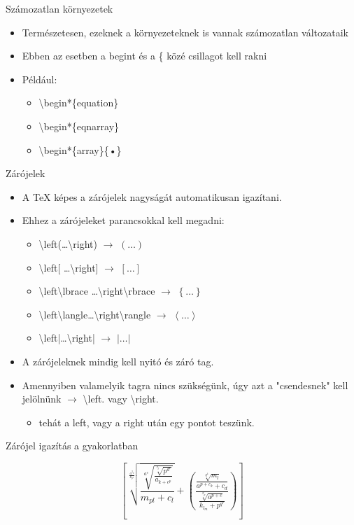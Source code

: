 \documentclass[11pt]{beamer}
\newcommand{\tbs}{\textbackslash}
\begin{document}
\begin{frame}{Számozatlan környezetek}
\begin{itemize}
\item Természetesen, ezeknek a környezeteknek is vannak számozatlan változataik
\item Ebben az esetben a begint és a \{ közé csillagot kell rakni
\item Például:
	\begin{itemize}
	\item \tbs begin*\{equation\}
	\item \tbs begin*\{eqnarray\}
	\item \tbs begin*\{array\}\{•\}
	\end{itemize}
\end{itemize}
\end{frame}

\begin{frame}{Zárójelek}
\begin{itemize}
\item A \TeX{} képes a zárójelek nagyságát automatikusan igazítani.
\item Ehhez a zárójeleket parancsokkal kell megadni:
	\begin{itemize}
	\item \tbs left(\dots\tbs right) $\rightarrow$ $\left(\dots\right)$
	\item \tbs left[ \dots \tbs right] $\rightarrow$ $\left[\dots\right]$
	\item \tbs left\tbs lbrace \dots \tbs right\tbs rbrace $\rightarrow$ $\left\lbrace\dots\right\rbrace$
	\item \tbs left\tbs langle\dots\tbs right\tbs rangle $\rightarrow$ $\left\langle\dots\right\rangle$
	\item \tbs left|\dots\tbs right| $\rightarrow$  $\left|\dots\right|$
	\end{itemize}
\item A zárójeleknek mindig kell nyitó és záró tag.
\item Amennyiben valamelyik tagra nincs szükségünk, úgy azt a "csendesnek" kell jelölnünk $\rightarrow$ \tbs left. vagy \tbs right.
	\begin{itemize}
	\item tehát a left, vagy a right után egy pontot teszünk.
	\end{itemize}
\end{itemize}
\end{frame}

\begin{frame}{Zárójel igazítás a gyakorlatban}
\begin{Huge}
$$ \left[\sqrt[\frac{a^{3_k}}{k_{p^c}}]{\frac{\sqrt[a^c]{\frac{\sqrt[c_j]{p^{d^c}}}{a_{k+c^p}}}}{m_{pl}+c_l}}+\left(\frac{\frac{\sqrt[q^4]{m_l}}{a^{p+c_k}+c_d}}{\frac{\sqrt[x_p]{a^{p+c}}}{k_{l_m}+p^{q^r}}}\right)\right]$$
\end{Huge}
\end{frame}
\end{document}
